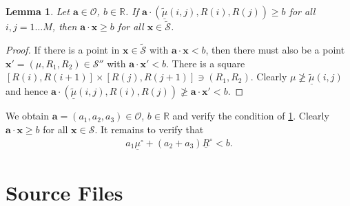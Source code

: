 \documentclass[a4paper,12pt]{scrartcl}
\newtheorem{lemma}{Lemma}
\newcommand{\ul}[1]{\ensuremath{\underline{#1}}}
\newcommand{\wt}[1]{\ensuremath{\widetilde{#1}}}
\newcommand{\vt}[1]{\ensuremath{\mathbf{#1}}}
\newcommand{\SSS}{\ensuremath{\mathcal S}}
\newcommand{\OOO}{\ensuremath{\mathcal O}}
\newcommand{\RR}{\ensuremath{\mathbb R}}
\begin{document}
\begin{lemma}
  \label{lem:bound}
  Let $\vt a \in \OOO$, $b \in \RR$. If $\vt a \cdot (\ul{\wt\mu}(i,j), R(i), R(j)) \ge b$ for all $i,j = 1\dots M$, then $\vt a \cdot \vt x \ge b$ for all $\vt x \in \wt\SSS$.   
\end{lemma}
\begin{proof}
  If there is a point in $\vt x \in \wt\SSS$ with $\vt a \cdot \vt x < b$, then there must also be a point $\vt x' = (\mu, R_1, R_2)  \in \SSS''$ with $\vt a \cdot \vt x' < b$. There is a square $[R(i), R(i+1)] \times [R(j), R(j+1)] \ni (R_1, R_2)$. Clearly $\mu \not\ge \ul{\wt\mu}(i,j)$ and hence $\vt a \cdot (\ul{\wt\mu}(i,j), R(i), R(j)) \not\ge \vt a \cdot \vt x' < b$.
\end{proof}

We obtain $\vt a = (a_1, a_2, a_3) \in \OOO$, $b \in \RR$ and verify the condition of \cref{lem:bound}. Clearly $\vt a \cdot \vt x \ge b$ for all $\vt x \in \SSS$. It remains to verify that
\begin{align}
  a_1 \ul\mu^\circ + (a_2 + a_3) \ul R^\circ < b  .
\end{align}

\section{Source Files}
\label{sec:source-files}
\end{document}
